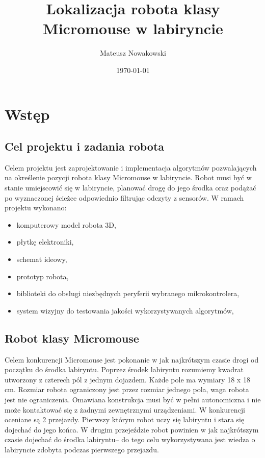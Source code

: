 \documentclass[12pt,a4paper,twoside,openright,fleqn]{mwrep}
\title{Lokalizacja robota klasy Micromouse w labiryncie}
\author{Mateusz Nowakowski}
\date{\today}
\begin{document}
\VerbatimFootnotes

\maketitle

\tableofcontents

 \chapter{Wstęp} 
 \section{Cel projektu i zadania robota} 
 Celem projektu jest zaprojektowanie i implementacja algorytmów pozwalających na określenie pozycji robota klasy Micromouse w labiryncie. Robot musi być w stanie umiejscowić się w labiryncie, planować drogę do jego środka oraz podążać po wyznaczonej ścieżce odpowiednio filtrując odczyty z sensorów. W ramach projektu wykonano:
 \begin{itemize}
     \item komputerowy model robota 3D,
     \item płytkę elektroniki,
     \item schemat ideowy,
     \item prototyp robota,
     \item biblioteki do obsługi niezbędnych peryferii wybranego mikrokontrolera,
     \item system wizyjny do testowania jakości wykorzystywanych algorytmów,
 \end{itemize}

 
 \section{Robot klasy Micromouse}
 Celem konkurencji Micromouse jest pokonanie w jak najkrótszym czasie drogi od początku do środka labiryntu. Poprzez środek labiryntu rozumiemy kwadrat utworzony z czterech pól z jednym dojazdem. Każde pole ma wymiary 18 x 18 cm. Rozmiar robota ograniczony jest przez rozmiar jednego pola, waga robota jest nie ograniczenia. Omawiana konstrukcja musi być w pełni autonomiczna i nie może kontaktować się z żadnymi zewnętrznymi urządzeniami. W konkurencji oceniane są 2 przejazdy. Pierwszy którym robot uczy się labiryntu i stara się dojechać do jego końca. W drugim przejeździe robot powinien w jak najkrótszym czasie dojechać do środka labiryntu-- do tego celu wykorzystywana jest wiedza o labiryncie zdobyta podczas pierwszego przejazdu.
\end{document}

